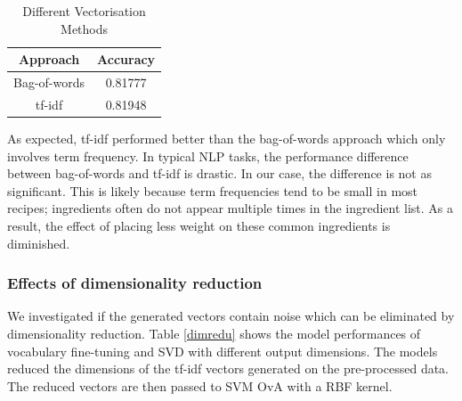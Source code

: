 \documentclass{article}
\begin{document}
\begin{table}[h]
\centering
\begin{tabular}{|c|c|}
\hline
\textbf{Approach}    & \multicolumn{1}{l|}{\textbf{Accuracy}} \\ \hline
Bag-of-words & 0.81777                       \\
tf-idf       & 0.81948                       \\
 \hline
\end{tabular}
\caption{Different Vectorisation Methods}
\label{vectorisation}
\end{table}

As expected, tf-idf performed better than the bag-of-words approach which only involves term frequency. In typical NLP tasks, the performance difference between bag-of-words and tf-idf is drastic. In our case, the difference is not as significant. This is likely because term frequencies tend to be small in most recipes; ingredients often do not appear multiple times in the ingredient list. As a result, the effect of placing less weight on these common ingredients is diminished.

\subsubsection*{Effects of dimensionality reduction}
We investigated if the generated vectors contain noise which can be eliminated by dimensionality reduction. Table \ref{dimredu} shows the model performances of vocabulary fine-tuning and SVD with different output dimensions. The models reduced the dimensions of the tf-idf vectors generated on the pre-processed data. The reduced vectors are then passed to SVM OvA with a RBF kernel.
\end{document}
